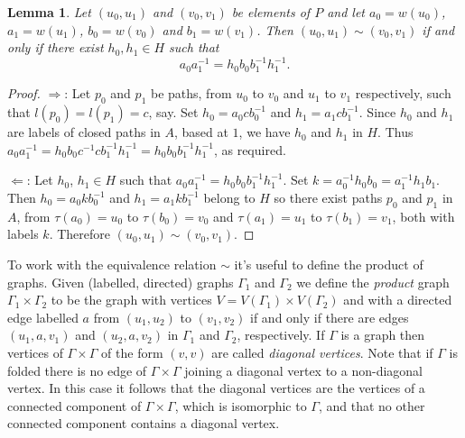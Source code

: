 \documentclass[a4paper,12pt]{article}
\newcommand{\G}{\Gamma }
\renewcommand{\t}{\tau }
\newtheorem{lemma}[theorem]{Lemma}
\numberwithin{equation}{section}
\numberwithin{figure}{section}
\begin{document}
\begin{lemma}\label{lem:equiv_verts}
Let $(u_0,u_1)$ and $(v_0,v_1)$ be elements of $P$ and let
$a_0=w(u_0)$, $a_1=w(u_1)$, $b_0=w(v_0)$ and $b_1=w(v_1)$. Then
$(u_0,u_1)\sim (v_0,v_1)$ if and only if there exist $h_0,h_1\in H$ such that
\[a_0a_1^{-1}=h_0b_0b_1^{-1}h_1^{-1}.\]
\end{lemma}
\begin{proof}
$\Rightarrow$: Let $p_0$ and $p_1$ be paths, from $u_0$ to $v_0$ and $u_1$ to $v_1$
respectively, such that $l(p_0)=l(p_1)=c$, say. Set $h_0=a_0cb_0^{-1}$ and
$h_1=a_1cb_1^{-1}$. Since $h_0$ and $h_1$ are labels of closed paths in $A$, based at $1$, we
have $h_0$ and $h_1$ in $H$. Thus
$a_0a_1^{-1}=h_0b_0c^{-1}cb_1^{-1}h_1^{-1}=h_0b_0b_1^{-1}h_1^{-1}$, as required.

$\Leftarrow$: Let $h_0$, $h_1 \in H$ such that $a_0a_1^{-1}=h_0b_0b_1^{-1}h_1^{-1}$.
Set $k=a_0^{-1}h_0b_0=a_1^{-1}h_1b_1$. Then $h_0=a_0kb_0^{-1}$ and $h_1=a_1kb_1^{-1}$
belong to $H$ so there exist paths $p_0$ and $p_1$ in $A$,
from $\t(a_0)=u_0$ to $\t(b_0)=v_0$ and
$\t(a_1)=u_1$ to $\t(b_1)=v_1$, both with labels $k$.
Therefore $(u_0,u_1)\sim (v_0,v_1)$.
\end{proof}


To work with the equivalence relation $\sim$ it's useful to define
the product of graphs. Given (labelled, directed)
graphs $\G_1$ and $\G_2$ we define the {\em
product} graph $\G_1\times \G_2$ to be the graph with vertices
$V=V(\G_1)\times V(\G_2)$ and with a directed edge labelled $a$
from $(u_1,u_2)$ to $(v_1,v_2)$ if and only if there are edges
$(u_1,a, v_1)$ and $(u_2,a,v_2)$ in $\G_1$ and $\G_2$,
respectively. If $\G$ is a graph then
vertices of $\G\times \G$ of
 the form $(v,v)$ are called {\em diagonal vertices}.
Note that if $\G$ is folded there is no edge of $\G\times \G$
joining a diagonal vertex to a non-diagonal vertex. In this case
it follows that the diagonal vertices are the vertices of a
connected component of $\G\times \G$, which is isomorphic to $\G$,
and that no other connected component contains a diagonal vertex.
\end{document}
